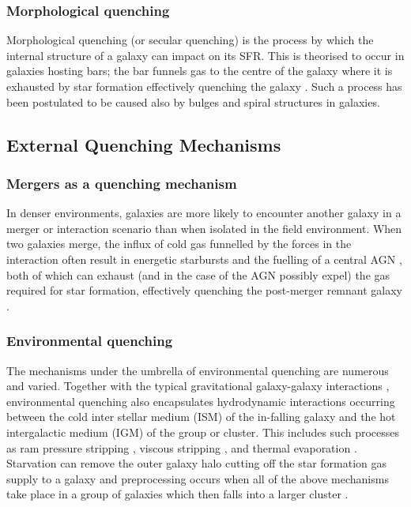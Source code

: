 \subsubsection{Morphological quenching}\label{sec:moprhquench}
Morphological quenching (or secular quenching) is the process by which the internal structure of a galaxy can impact on its SFR. This is theorised to occur in galaxies hosting bars; the bar funnels gas to the centre of the galaxy \citep{athanassoula92a} where it is exhausted by star formation effectively quenching the galaxy \citep{sheth05, zurita04, masters10c}. Such a process has been postulated to be caused also by bulges \citep{bluck14} and spiral \citep{hart16} structures in galaxies. 
  
\subsection{External Quenching Mechanisms}\label{sec:extquench}
  
\subsubsection{Mergers as a quenching mechanism}\label{sec:mergersquench}
In denser environments, galaxies are more likely to encounter another galaxy in a merger or interaction scenario than when isolated in the field environment. When two galaxies merge, the influx of cold gas funnelled by the forces in the interaction often result in energetic starbursts and the fuelling of a central AGN \citep{hopkins05}, both of which can exhaust  (and in the case of the AGN possibly expel) the gas required for star formation, effectively quenching the post-merger remnant galaxy \citep{pontzen16}. 

\subsubsection{Environmental quenching}\label{sec:envquench}
The mechanisms under the umbrella of environmental quenching are  numerous and varied. Together with the typical gravitational galaxy-galaxy interactions \citep{moore96}, environmental quenching also encapsulates hydrodynamic interactions occurring between the cold inter stellar medium (ISM) of the in-falling galaxy and the hot intergalactic medium (IGM) of the group or cluster. This includes such processes as ram pressure stripping \citep{gunngott72}, viscous stripping \citep{nulsen82}, and thermal evaporation \citep[a rapid rise in temperature of the ISM due to contact with the IGM;][]{cowie77}. Starvation \citep{larson80} can remove the outer galaxy halo cutting off the star formation gas supply to a galaxy and preprocessing occurs when all of the above mechanisms take place in a group of galaxies which then falls into a larger cluster \citep{dressler04}. 

